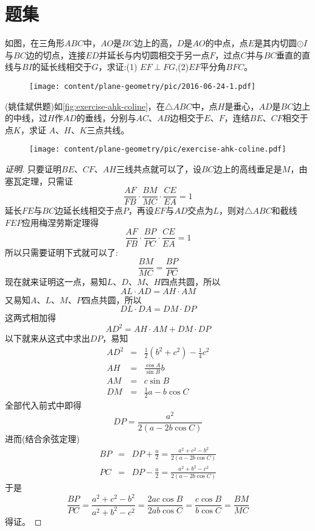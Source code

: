 
\section{题集}

\begin{exercise}
\label{exercise:2016-06-24-1}
  如图，在三角形$ABC$中，$AO$是$BC$边上的高，$D$是$AO$的中点，点$E$是其内切圆$\odot I$与$BC$边的切点，连接$ED$并延长与内切圆相交于另一点$F$，过点$C$并与$BC$垂直的直线与$BI$的延长线相交于$G$，求证:(1) $EF \perp FG$,(2)$EF$平分角$BFC$。
\end{exercise}

\begin{figure}[htbp]
  \centering
\texttt{[image: content/plane-geometry/pic/2016-06-24-1.pdf]}
\caption{}
\label{fig:2016-06-24-1}
\end{figure}

\begin{exercise}
 (姚佳斌供题)如\autoref{fig:exercise-ahk-coline}，在$\triangle ABC$中，点$H$是垂心，$AD$是$BC$边上的中线，过$H$作$AD$的垂线，分别与$AC$、$AB$边相交于$E$、$F$，连结$BE$、$CF$相交于点$K$，求证 $A$、$H$、$K$三点共线。
\end{exercise}

\begin{figure}[htbp]
  \centering
\texttt{[image: content/plane-geometry/pic/exercise-ahk-coline.pdf]}
\caption{}
\label{fig:exercise-ahk-coline}
\end{figure}

\begin{proof}[证明]
  只要证明$BE$、$CF$、$AH$三线共点就可以了，设$BC$边上的高线垂足是$M$，由塞瓦定理，只需证
  \[ \frac{AF}{FB} \cdot \frac{BM}{MC} \cdot \frac{CE}{EA} = 1 \]
  延长$FE$与$BC$边延长线相交于点$P$，再设$EF$与$AD$交点为$L$，则对$\triangle ABC$和截线$FEP$应用梅涅劳斯定理得
  \[ \frac{AF}{FB} \cdot \frac{BP}{PC} \cdot \frac{CE}{EA} = 1 \]
  所以只需要证明下式就可以了:
  \[ \frac{BM}{MC} = \frac{BP}{PC} \]
  现在就来证明这一点，易知$L$、$D$、$M$、$H$四点共圆，所以
  \[ AL \cdot AD = AH \cdot AM \]
  又易知$A$、$L$、$M$、$P$四点共圆，所以
  \[ DL \cdot DA = DM \cdot DP \]
  这两式相加得
  \[ AD^2 = AH \cdot AM + DM \cdot DP \]
  以下就来从这式中求出$DP$，易知
  \begin{eqnarray*}
    AD^2 & = & \frac{1}{2}(b^2+c^2)-\frac{1}{4}c^2 \\
    AH & = & \frac{\cos{A}}{\sin{B}}b \\
    AM & = & c \sin{B} \\
    DM & = & \frac{1}{2}a-b \cos{C}
  \end{eqnarray*}
  全部代入前式中即得
  \[ DP = \frac{a^2}{2(a-2b\cos{C})} \]
  进而(结合余弦定理)
  \begin{eqnarray*}
  BP & = & DP+\frac{a}{2} = \frac{a^2+c^2-b^2}{2(a-2b\cos{C})}  \\
  PC & = & DP-\frac{a}{2} = \frac{a^2+b^2-c^2}{2(a-2b\cos{C})} 
  \end{eqnarray*}
  于是
  \[ \frac{BP}{PC} = \frac{a^2+c^2-b^2}{a^2+b^2-c^2} = \frac{2ac\cos{B}}{2ab\cos{C}} = \frac{c\cos{B}}{b\cos{C}} = \frac{BM}{MC} \]
  得证。
\end{proof}


